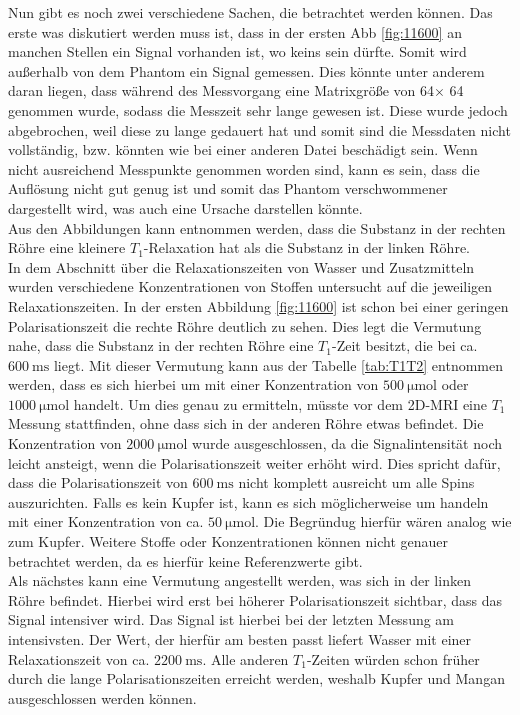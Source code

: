 Nun gibt es noch zwei verschiedene Sachen, die betrachtet werden können. Das erste was diskutiert werden muss ist, dass in der ersten Abb \ref{fig:11600} an manchen Stellen ein Signal vorhanden ist, wo keins sein dürfte. Somit wird außerhalb von dem Phantom ein Signal gemessen. Dies könnte unter anderem daran liegen, dass während des Messvorgang eine Matrixgröße von 64$\times$ 64 genommen wurde, sodass die Messzeit sehr lange gewesen ist. Diese wurde jedoch abgebrochen, weil diese zu lange gedauert hat und somit sind die Messdaten nicht vollständig, bzw. könnten wie bei einer anderen Datei beschädigt sein. Wenn nicht ausreichend Messpunkte genommen worden sind, kann es sein, dass die Auflösung nicht gut genug ist und somit das Phantom verschwommener dargestellt wird, was auch eine Ursache darstellen könnte.\\
Aus den Abbildungen kann entnommen werden, dass die Substanz in der rechten Röhre eine kleinere $T_1$-Relaxation hat als die Substanz in der linken Röhre.\\
In dem Abschnitt über die \glqq Relaxationszeiten von Wasser und Zusatzmitteln\grqq \, wurden verschiedene Konzentrationen von Stoffen untersucht auf die jeweiligen Relaxationszeiten. In der ersten Abbildung \ref{fig:11600} ist schon bei einer geringen Polarisationszeit die rechte Röhre deutlich zu sehen. Dies legt die Vermutung nahe, dass die Substanz in der  rechten Röhre eine $T_1$-Zeit besitzt, die bei ca. $\SI{600}{\milli\second}$ liegt. Mit dieser Vermutung kann aus der Tabelle \ref{tab:T1T2} entnommen werden, dass es sich hierbei um  mit einer Konzentration von $\SI{500}{\micro\mole}$ oder 
$\SI{1000}{\micro\mole}$ handelt. Um dies genau zu ermitteln, müsste vor dem 2D-MRI 
eine $T_1$ Messung stattfinden, ohne dass sich in der anderen Röhre etwas befindet. Die Konzentration von $\SI{2000}{\micro\mole}$ wurde ausgeschlossen, da die Signalintensität noch leicht ansteigt, wenn die Polarisationszeit weiter erhöht wird. Dies spricht dafür, dass die Polarisationszeit von $\SI{600}{\milli\second}$ nicht komplett ausreicht um alle Spins auszurichten. Falls es kein Kupfer ist, kann es sich möglicherweise um  handeln mit einer Konzentration von ca. $\SI{50}{\micro\mole}$. Die Begründug hierfür wären analog wie zum Kupfer. Weitere Stoffe oder Konzentrationen können nicht genauer betrachtet werden, da es hierfür keine Referenzwerte gibt.\\
Als nächstes kann eine Vermutung angestellt werden, was sich in der linken Röhre befindet. Hierbei wird erst bei höherer Polarisationszeit sichtbar, dass das Signal intensiver wird. Das Signal ist hierbei bei der letzten Messung am intensivsten. Der Wert, der hierfür am besten passt liefert Wasser mit einer Relaxationszeit von ca. $\SI{2200}{\milli\second}$. Alle anderen $T_1$-Zeiten würden schon früher durch die lange Polarisationszeiten erreicht werden, weshalb Kupfer und Mangan ausgeschlossen werden können.\\


